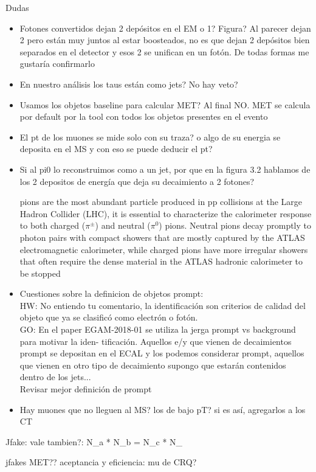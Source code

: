 



{\LARGE Dudas}

\begin{itemize}
	\item Fotones convertidos dejan 2 depósitos en el EM o 1? Figura? Al parecer dejan 2 pero están muy juntos al estar boosteados, no es que dejan 2 depósitos bien separados en el detector y esos 2 se unifican en un fotón. De todas formas me gustaría confirmarlo
	\item En nuestro análisis los taus están como jets? No hay veto?
	\item Usamos los objetos baseline para calcular MET? Al final NO. MET se calcula por default por la tool con todos los objetos presentes en el evento
	\item El pt de los muones se mide solo con su traza? o algo de su energia se deposita en el MS y con eso se puede deducir el pt?
	\item Si al pi0 lo reconstruimos como a un jet, por que en la figura 3.2 hablamos de los 2 depositos de energía que deja su decaimiento a 2 fotones?

	pions are the most abundant particle produced in pp collisions at the Large Hadron Collider
(LHC), it is essential to characterize the calorimeter response to both charged ($\pi^{\pm}$) and neutral ($\pi^{0}$) pions. Neutral pions decay promptly to photon pairs with compact showers that are mostly captured by the
ATLAS electromagnetic calorimeter, while charged pions have more irregular showers that often require
the dense material in the ATLAS hadronic calorimeter to be stopped

	\item Cuestiones sobre la definicion de objetos prompt: \\
	HW: No entiendo tu comentario, la identificación son criterios de calidad del objeto que ya se clasificó como electrón o fotón. \\
	GO: En	el paper EGAM-2018-01 se utiliza la jerga prompt vs background para motivar la iden-
	tificación. Aquellos e/y que vienen de decaimientos prompt se depositan en el ECAL y
	los podemos considerar prompt, aquellos que vienen en otro tipo de decaimiento supongo
	que estarán contenidos dentro de los jets... \\
	Revisar mejor definición de prompt
	\item Hay muones que no lleguen al MS? los de bajo pT? si es así, agregarlos a los CT
\end{itemize}

Jfake:
vale tambien?: N_a * N_b = N_c * N_



jfakes MET??
aceptancia y eficiencia:
mu de CRQ?